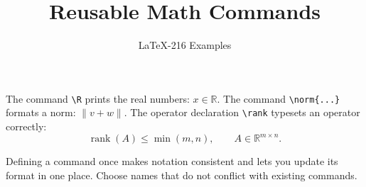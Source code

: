 \documentclass{article}
\title{Reusable Math Commands}
\author{LaTeX-216 Examples}
\date{}
\newcommand{\R}{\mathbb{R}}
\newcommand{\norm}[1]{\left\lVert #1 \right\rVert}
\DeclareMathOperator{\rank}{rank}
\begin{document}
\maketitle

The command \verb|\R| prints the real numbers: $x\in\R$.
The command \verb|\norm{...}| formats a norm: $\norm{v+w}$.
The operator declaration \verb|\rank| typesets an operator correctly:
\[
  \rank(A) \leq \min(m,n), \qquad A\in\R^{m\times n}.
\]

Defining a command once makes notation consistent and lets you update its
format in one place. Choose names that do not conflict with existing commands.
\end{document}

